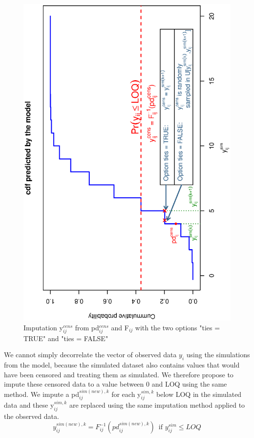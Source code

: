 \begin{figure}[!h] 
\includegraphics[angle=270,scale=0.7]{figs/imputation.eps} 
\caption{Imputation y$_{ij}^{cens}$ from pd$_{ij}^{cens}$ and F$_{ij}$ with the two options {\sf "ties = TRUE"} and 
{\sf "ties = FALSE"}} \label{fig:imputation} 
\end{figure}

We cannot simply decorrelate the vector of observed data $y_{i}$ using the simulations from the model, because the 
simulated dataset also contains values that would have been censored and treating them as simulated. We therefore 
propose to impute these censored data to a value between 0 and LOQ using the same method. We impute a 
pd$_{ij}^{sim(new),k}$ for each y$_{ij}^{sim,k}$ below LOQ in the simulated data and these y$_{ij}^{sim,k}$ are 
replaced using the same imputation method applied to the observed data. \begin{equation} 
y_{ij}^{sim(new),k}=F_{ij}^{-1}(pd_{ij}^{sim(new),k})\,\,\,\mbox{if }y_{ij}^{sim}\leq LOQ \end{equation}


